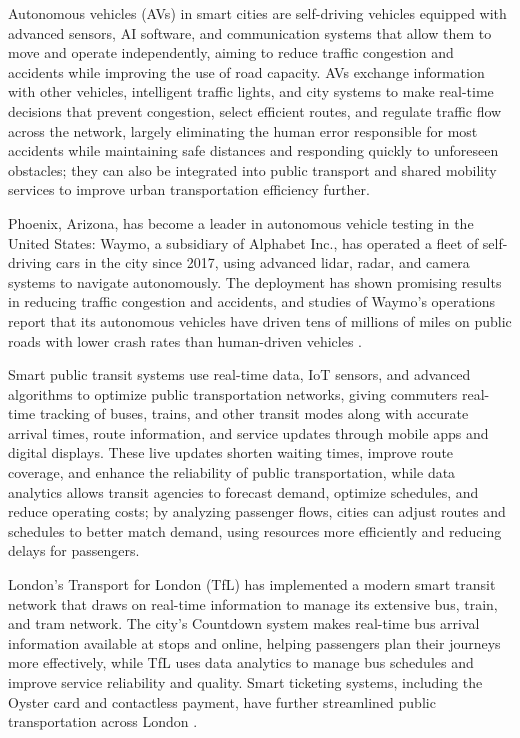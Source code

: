\documentclass[journal]{IEEEtran}
\begin{document}
Autonomous vehicles (AVs) in smart cities are self-driving vehicles equipped with advanced sensors, AI software, and communication systems that allow them to move and operate independently, aiming to reduce traffic congestion and accidents while improving the use of road capacity. AVs exchange information with other vehicles, intelligent traffic lights, and city systems to make real-time decisions that prevent congestion, select efficient routes, and regulate traffic flow across the network, largely eliminating the human error responsible for most accidents while maintaining safe distances and responding quickly to unforeseen obstacles; they can also be integrated into public transport and shared mobility services to improve urban transportation efficiency further.

Phoenix, Arizona, has become a leader in autonomous vehicle testing in the United States: Waymo, a subsidiary of Alphabet Inc., has operated a fleet of self-driving cars in the city since 2017, using advanced lidar, radar, and camera systems to navigate autonomously. The deployment has shown promising results in reducing traffic congestion and accidents, and studies of Waymo's operations report that its autonomous vehicles have driven tens of millions of miles on public roads with lower crash rates than human-driven vehicles \cite{r76,r103}.

Smart public transit systems use real-time data, IoT sensors, and advanced algorithms to optimize public transportation networks, giving commuters real-time tracking of buses, trains, and other transit modes along with accurate arrival times, route information, and service updates through mobile apps and digital displays. These live updates shorten waiting times, improve route coverage, and enhance the reliability of public transportation, while data analytics allows transit agencies to forecast demand, optimize schedules, and reduce operating costs; by analyzing passenger flows, cities can adjust routes and schedules to better match demand, using resources more efficiently and reducing delays for passengers.

London's Transport for London (TfL) has implemented a modern smart transit network that draws on real-time information to manage its extensive bus, train, and tram network. The city's Countdown system makes real-time bus arrival information available at stops and online, helping passengers plan their journeys more effectively, while TfL uses data analytics to manage bus schedules and improve service reliability and quality. Smart ticketing systems, including the Oyster card and contactless payment, have further streamlined public transportation across London \cite{r77,r104}.
\end{document}
